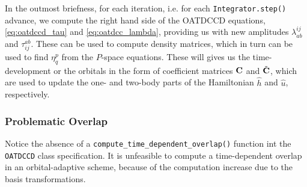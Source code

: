     In the outmost briefness, for each iteration, i.e. for each 
    \lstinline{Integrator.step()} advance, we 
    compute the right hand side of the OATDCCD equations, \autoref{eq:oatdccd_tau} 
    and \autoref{eq:oatdcc_lambda}, providing us with new amplitudes 
    $\lambda^{ij}_{ab}$ and $\tau^{ab}_{ij}$. These can be used to compute density 
    matrices, which in turn can be used to find $\eta^p_q$ from the $P$-space 
    equations. These will gives us the time-development or the orbitals in 
    the form of coefficient matrices $\vb{C}$ and $\tilde{\vb{C}}$, which are used 
    to update the one- and two-body parts of the Hamiltonian $\hat{h}$ and $\hat{u}$,
    respectively.

    

    \subsubsection{Problematic Overlap}

    Notice the absence of a \lstinline{compute_time_dependent_overlap()} function
    int the \lstinline{OATDCCD} class specification. It is unfeasible to compute 
    a time-dependent overlap in an orbital-adaptive scheme, because of the 
    computation increase due to the basis transformations.

